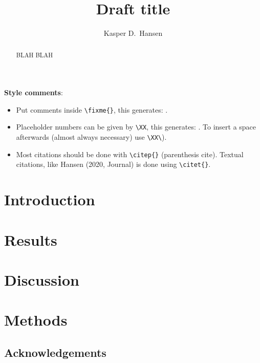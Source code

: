 \documentclass[pdftex,english,12pt]{article}
\begin{document}
\title{Draft title}

\author[1,2,*]{Kasper D.\ Hansen}

\date{}
\maketitle

\begin{abstract}
  \noindent 
  BLAH BLAH
\end{abstract}

\textbf{Style comments}:
\begin{itemize}
\item Put comments inside \verb|\fixme{}|, this generates: .
\item Placeholder numbers can be given by \verb|\XX|, this generates: \XX. To insert a space afterwards (almost always necessary) use \verb|\XX\|). 
\item Most citations should be done with \verb|\citep{}| (parenthesis cite).  Textual citations, like Hansen (2020, Journal) is done using \verb|\citet{}|.
\end{itemize}

\clearpage

\section*{Introduction}

\section*{Results}

\section*{Discussion}

\section*{Methods}

\subsection*{Acknowledgements}
\end{document}
